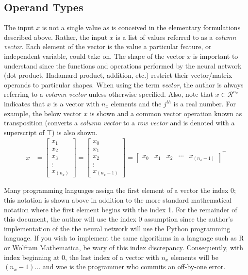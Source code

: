 \documentclass{article}
\begin{document}
\subsection{Operand Types}

The input $x$ is not a single value as is conceived in the elementary
formulations described above. Rather, the input $x$ is a list of
values referred to as a \textit{column vector}. Each element of the vector
is the value a particular feature, or independent variable, could take on.
The shape of the vector $x$ is important to understand since the functions and operations
performed by the neural network (dot product, Hadamard product, addition, etc.)
restrict their vector/matrix operands to particular shapes. When using the term
\textit{vector}, the author is always referring to a \textit{column vector}
unless otherwise specified. Also, note that $x \in \mathcal{R}^{n_x}$ indicates
that $x$ is a vector with $n_x$ elements and the $j^{th}$ is a real number.
For example, the below vector $x$ is shown and a common vector operation
known as transposition (converts a \textit{column vector} to a
\textit{row vector} and is denoted with a superscript of $\top$) is also shown.
\begin{align}
	x & = \begin{bmatrix}
		x_{1}  \\
		x_{2}  \\
		x_{3}  \\
		\vdots \\
		x_{(n_x)}
	\end{bmatrix}
	=
	\begin{bmatrix}
		x_{0}  \\
		x_{1}  \\
		x_{2}  \\
		\vdots \\
		x_{(n_{x}-1)}
	\end{bmatrix}
	=
	\begin{bmatrix}
		x_{0} & x_{1} & x_{2} & \cdots & x_{(n_{x}-1)}
	\end{bmatrix}^\top
\end{align}

Many programming languages assign the first element of a vector the index
0; this notation is shown above in addition to the more standard
mathematical notation where the first element begins with the index 1.
For the remainder of this document, the author will use the index 0 assumption
since the author's implementation of the the neural network will use the Python
programming language. If you wish to implement the same algorithms in a language
such as R or Wolfram Mathematica, be wary of this index discrepancy.
Consequently, with index beginning at 0, the last index of a vector with
$n_x$ elements will be $(n_x - 1)$... and woe is the programmer who commits an
off-by-one error.
\end{document}
